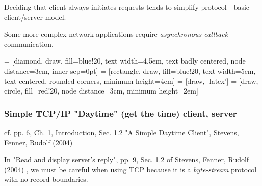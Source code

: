 \documentclass[10pt]{amsart}
\begin{document}
Deciding that client always initiates requests tends to simplify protocol - basic client/server model.

Some more complex network applications require \emph{asynchronous callback} communication.



 = [diamond, draw, fill=blue!20, 
text width=4.5em, text badly centered, node distance=3cm, inner sep=0pt]
 = [rectangle, draw, fill=blue!20, 
text width=5em, text centered, rounded corners, minimum height=4em]
 = [draw, -latex']
 = [draw, circle, fill=red!20, node distance=3cm,
minimum height=2em]


\subsubsection{Simple TCP/IP "Daytime" (get the time) client, server}

cf. pp. 6, Ch. 1, Introduction, Sec. 1.2 "A Simple Daytime Client", Stevens, Fenner, Rudolf (2004) \cite{SFR2004}

In "Read and display server's reply", pp. 9, Sec. 1.2 of Stevens, Fenner, Rudolf (2004) \cite{SFR2004}, we must be careful when using TCP because it is a \emph{byte-stream} protocol with no record boundaries. 
\end{document}
